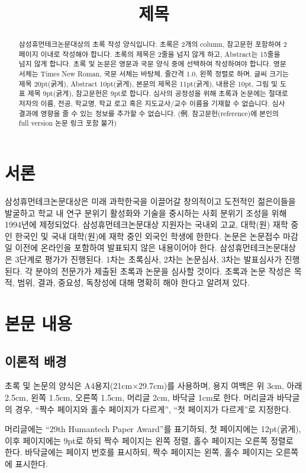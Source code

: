 \documentclass{humantech}
\title{제목} %
\begin{document}
\maketitle
\begin{abstract}
	삼성휴먼테크논문대상의 초록 작성 양식입니다. 초록은 2개의 column, 참고문헌 포함하여 \mbox{2페이지} 이내로 작성해야 합니다. 초록의 제목은 2줄을 넘지 않게 하고, Abstract는 15줄을 넘지 않게 합니다. 초록 및 논문은 영문과 국문 양식 중에 선택하여 작성하여야 합니다. 영문 서체는 Times New Roman, 국문 서체는 바탕체, 줄간격 1.0, 왼쪽 정렬로 하며, 글씨 크기는 제목 20pt(굵게), Abstract 10pt(굵게), 본문의 제목은 11pt(굵게), 내용은 10pt, 그림 및 도표 제목 9pt(굵게), 참고문헌은 9pt로 합니다. 심사의 공정성을 위해 초록과 논문에는 절대로 저자의 이름, 전공, 학교명, 학교 로고 혹은 지도교사/교수 이름을 기재할 수 없습니다. 심사결과에 영향을 줄 수 있는 정보를 추가할 수 없습니다. (例. 참고문헌(reference)에 본인의 full version 논문 링크 포함 불가)
\end{abstract}

\section{서론}
삼성휴먼테크논문대상은 미래 과학한국을 이끌어갈 창의적이고 도전적인 젊은이들을 발굴하고 학교 내 연구 분위기 활성화와 기술을 중시하는 사회 분위기 조성을 위해 1994년에 제정되었다. 삼성휴먼테크논문대상 지원자는 국내외 고교, 대학(원) 재학 중인 한국인 및 국내 대학(원)에 재학 중인 외국인 학생에 한한다. 논문은 논문접수 마감일 이전에 온라인을 포함하여 발표되지 않은 내용이어야 한다. 삼성휴먼테크논문대상은 3단계로 평가가 진행된다. 1차는 초록심사, 2차는 논문심사, 3차는 발표심사가 진행된다. 각 분야의 전문가가 제출된 초록과 논문을 심사할 것이다. 초록과 논문 작성은 목적, 범위, 결과, 중요성, 독창성에 대해 명확히 해야 한다고 알려져 있다.

\section{본문 내용}
\subsection{이론적 배경}
초록 및 논문의 양식은 A4용지(21cm×29.7cm)를 사용하며, 용지 여백은 위 3cm, 아래 2.5cm, 왼쪽 1.5cm, 오른쪽 1.5cm, 머리글 2cm, 바닥글 1cm로 한다. 머리글과 바닥글의 경우, ``짝수 페이지와 홀수 페이지가 다르게'', ``첫 페이지가 다르게''로 지정한다.

머리글에는 ``29th Humantech Paper Award''를 표기하되, 첫 페이지에는 12pt(굵게), 이후 페이지에는 9pt로 하되 짝수 페이지는 왼쪽 정렬, 홀수 페이지는 오른쪽 정렬로 한다. 바닥글에는 페이지 번호를 표시하되, 짝수 페이지는 왼쪽, 홀수 페이지는 오른쪽에 표시한다.
\end{document}
